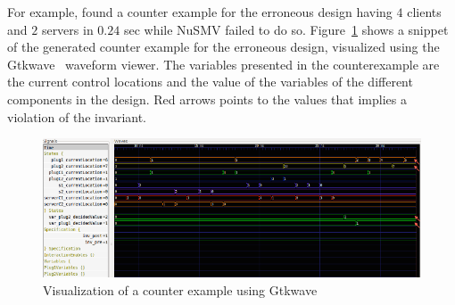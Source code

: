  For example, \biptool{} found a counter example for the erroneous 
design having $4$ clients and $2$ servers in $0.24$ sec while NuSMV failed to do so.
Figure~\ref{fig:res:counter} shows a snippet of the generated counter example for the erroneous design, visualized using the Gtkwave~\cite{bybell2010gtkwave} waveform viewer. 
The variables presented in the counterexample are the current control locations and the value of the variables of the different components in the design. Red arrows points to the values that implies a violation of the invariant. 
%
\begin{figure}
\centering
 \includegraphics[width=\linewidth]{figures/quorumDebug2}
\caption{Visualization of a counter example using Gtkwave}
\label{fig:res:counter}
\end{figure}
%
